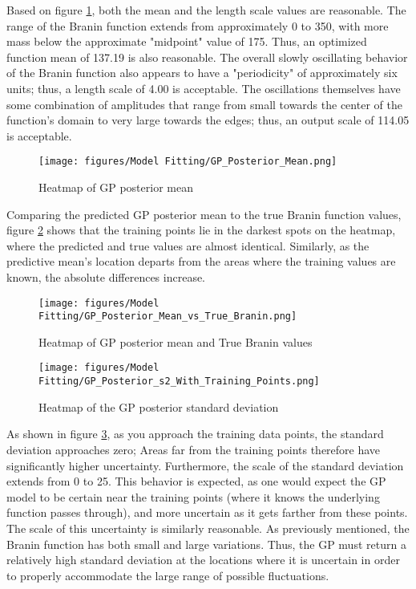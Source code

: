 \documentclass[11pt]{article}
\numberwithin{equation}{section}
\begin{document}
Based on figure \ref{fig:gp_post_mean_heatmap}, both the mean and the length
scale values are reasonable. The range of the Branin function extends from
approximately 0 to 350, with more mass below the approximate "midpoint" value
of 175. Thus, an optimized function mean of 137.19 is also reasonable. The
overall slowly oscillating behavior of the Branin function also appears to
have a "periodicity" of approximately six units; thus, a length scale of
4.00 is acceptable. The oscillations themselves have some combination of
amplitudes that range from small towards the center of the function's domain
to very large towards the edges; thus, an output scale of
114.05 is acceptable.

\begin{figure}[H]
  \centering
  \texttt{[image: figures/Model Fitting/GP\_Posterior\_Mean.png]}
  \caption{Heatmap of GP posterior mean}
  \label{fig:gp_post_mean_heatmap}
\end{figure}

Comparing the predicted GP posterior mean to the true Branin function values,
figure \ref{fig:gp_postmean_and_trueval} shows that the training points lie in
the darkest spots on the heatmap, where the predicted and
true values are almost identical. Similarly, as the predictive mean's
location departs from the areas where the training values are known, the absolute
differences increase.

\begin{figure}[H]
  \centering
  \texttt{[image: figures/Model Fitting/GP\_Posterior\_Mean\_vs\_True\_Branin.png]}
  \caption{Heatmap of GP posterior mean and True Branin values}
  \label{fig:gp_postmean_and_trueval}
\end{figure}

\begin{figure}[H]
  \centering
  \texttt{[image: figures/Model Fitting/GP\_Posterior\_s2\_With\_Training\_Points.png]}
  \caption{Heatmap of the GP posterior standard deviation}
  \label{fig:gp_post_std}
\end{figure}
As shown in figure \ref{fig:gp_post_std}, as you approach the training data points, the standard deviation approaches zero; Areas far from the training points therefore have significantly higher uncertainty. Furthermore, the scale of the standard deviation extends from 0 to 25. This behavior is expected, as one would expect the GP model to be certain near the training points (where it knows the underlying function passes through), and more uncertain as it gets farther from these points. The scale of this uncertainty is similarly reasonable. As previously mentioned, the Branin function has both small and large variations. Thus, the GP must return a relatively high standard deviation at the locations where it is uncertain in order to properly accommodate the large range of possible fluctuations.
\end{document}
